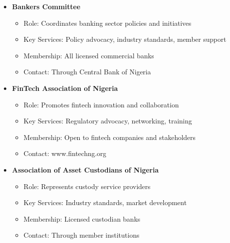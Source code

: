\begin{tcolorbox}[
    colback=white,
    colframe=primarydark,
    title=\textbf{Banking and Finance Associations},
    before skip=1em,
    after skip=1em
]
    \begin{itemize}[leftmargin=*,itemsep=0.5em]
        \item \textbf{Bankers Committee}
        \begin{itemize}[itemsep=0.3em]
            \item Role: Coordinates banking sector policies and initiatives
            \item Key Services: Policy advocacy, industry standards, member support
            \item Membership: All licensed commercial banks
            \item Contact: Through Central Bank of Nigeria
        \end{itemize}

        \vspace{0.5em}

        \item \textbf{FinTech Association of Nigeria}
        \begin{itemize}[itemsep=0.3em]
            \item Role: Promotes fintech innovation and collaboration
            \item Key Services: Regulatory advocacy, networking, training
            \item Membership: Open to fintech companies and stakeholders
            \item Contact: www.fintechng.org
        \end{itemize}

        \vspace{0.5em}

        \item \textbf{Association of Asset Custodians of Nigeria}
        \begin{itemize}[itemsep=0.3em]
            \item Role: Represents custody service providers
            \item Key Services: Industry standards, market development
            \item Membership: Licensed custodian banks
            \item Contact: Through member institutions
        \end{itemize}
    \end{itemize}
\end{tcolorbox}

